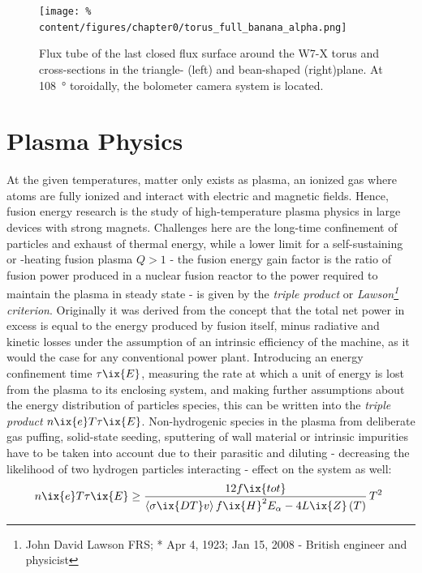 %
        \begin{figure}%
            \centering%
            \texttt{[image: \%
                content/figures/chapter0/torus\_full\_banana\_alpha.png]}%
            \caption{Flux tube of the last closed flux surface around the W7-X torus and cross-sections in the triangle- (left) and bean-shaped (right)plane. At \SI{108}{\degree} toroidally, the bolometer camera system is located.}\label{fig:trianglebeanFS}%
        \end{figure}%
%
    \section{Plasma Physics}\label{sec:plasmaphysics}%
%
        At the given temperatures, matter only exists as plasma, an ionized gas where atoms are fully ionized and interact with electric and magnetic fields. Hence, fusion energy research is the study of high-temperature plasma physics in large devices with strong magnets. Challenges here are the long-time confinement of particles and exhaust of thermal energy, while a lower limit for a self-sustaining or -heating fusion plasma $Q>1$ - the fusion energy gain factor is the ratio of fusion power produced in a nuclear fusion reactor to the power required to maintain the plasma in steady state - is given by the \textit{triple product} or \textit{Lawson\footnote[1]{John David Lawson FRS; * Apr 4, 1923; \textdagger Jan 15, 2008 - British engineer and physicist} criterion}. Originally it was derived from the concept that the total net power in excess is equal to the energy produced by fusion itself, minus radiative and kinetic losses under the  assumption of an intrinsic efficiency of the machine, as it would the case for any conventional power plant. Introducing an energy confinement time $\tau\ix{E}$, measuring the rate at which a unit of energy is lost from the plasma to its enclosing system, and making further assumptions about the energy distribution of particles species, this can be written into the \textit{triple product} $n\ix{e}T\tau\ix{E}$. Non-hydrogenic species in the plasma from deliberate gas puffing, solid-state seeding, sputtering of wall material or intrinsic impurities have to be taken into account due to their parasitic and diluting - decreasing the likelihood of two hydrogen particles interacting - effect on the system as well:%
%
        \begin{align}%
            n\ix{e}T\tau\ix{E}\ge\frac{12f\ix{tot}}{\left\langle\sigma\ix{DT}v\right\rangle f\ix{H}^{2}E_{\alpha}-4L\ix{Z}\left(T\right)}\,T^{2}\,\,\label{eq:lawson}%
        \end{align}%
